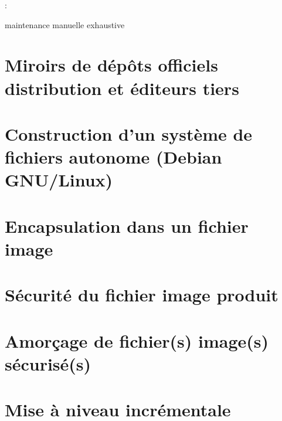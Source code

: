 :
\begin{itmz}
\item{\ml{}
{maintenance manuelle exhaustive}}
\end{itmz}

\ml
{\section{\todo}}
{\section{Miroirs de dépôts officiels distribution et éditeurs tiers}}

\ml
{\section{\todo}}
{\section{Construction d’un système de fichiers autonome (Debian GNU/Linux)}}

\ml
{\section{\todo}}
{\section{Encapsulation dans un fichier image}}

\ml
{\section{\todo}}
{\section{Sécurité du fichier image produit}}

\ml
{\section{\todo}}
{\section{Amorçage de fichier(s) image(s) sécurisé(s)}}

\ml
{\section{\todo}}
{\section{Mise à niveau incrémentale}}

